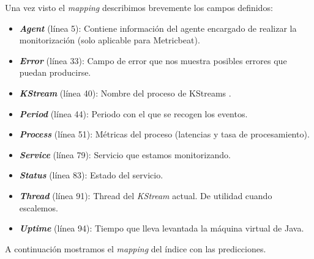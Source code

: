 Una vez visto el \textit{mapping} describimos brevemente los campos definidos:

\begin{itemize}
\item \textbf{\textit{Agent}} (línea 5): Contiene información del agente encargado de realizar la monitorización (solo aplicable para Metricbeat).

\item \textbf{\textit{Error}} (línea 33): Campo de error que nos muestra posibles errores que puedan producirse. 

\item \textbf{\textit{KStream}} (línea 40): Nombre del proceso de KStreams .

\item \textbf{\textit{Period}} (línea 44): Periodo con el que se recogen los eventos.

 \item \textbf{\textit{Process}} (línea 51): Métricas del proceso (latencias y tasa de procesamiento). 
 
 \item \textbf{\textit{Service}} (línea 79): Servicio que estamos monitorizando. 


 \item \textbf{\textit{Status}} (línea 83): Estado del servicio.
 
  \item \textbf{\textit{Thread}} (línea 91): Thread del \textit{KStream} actual. De utilidad cuando escalemos.
  
   \item \textbf{\textit{Uptime}} (línea 94): Tiempo que lleva levantada la máquina virtual de Java.

\end{itemize}


A continuación mostramos el \textit{mapping} del índice con las predicciones. 

